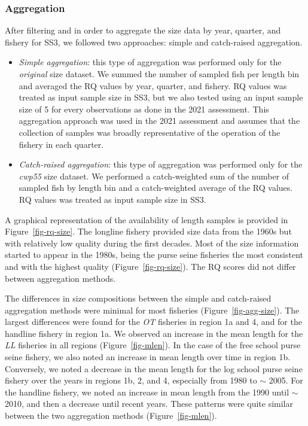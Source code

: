 \documentclass[
]{scrartcl}
\begin{document}
\subsubsection{Aggregation}\label{aggregation-1}

After filtering and in order to aggregate the size data by year,
quarter, and fishery for SS3, we followed two approaches: simple and
catch-raised aggregation.

\begin{itemize}
\item
  \emph{Simple aggregation}: this type of aggregation was performed only
  for the \emph{original} size dataset. We summed the number of sampled
  fish per length bin and averaged the RQ values by year, quarter, and
  fishery. RQ values was treated as input sample size in SS3, but we
  also tested using an input sample size of 5 for every observations as
  done in the 2021 assessment. This aggregation approach was used in the
  2021 assessment and assumes that the collection of samples was broadly
  representative of the operation of the fishery in each quarter.
\item
  \emph{Catch-raised aggregation}: this type of aggregation was
  performed only for the \emph{cwp55} size dataset. We performed a
  catch-weighted sum of the number of sampled fish by length bin and a
  catch-weighted average of the RQ values. RQ values was treated as
  input sample size in SS3.
\end{itemize}

A graphical representation of the availability of length samples is
provided in Figure~\ref{fig-rq-size}. The longline fishery provided size
data from the 1960s but with relatively low quality during the first
decades. Most of the size information started to appear in the 1980s,
being the purse seine fisheries the most consistent and with the highest
quality (Figure~\ref{fig-rq-size}). The RQ scores did not differ between
aggregation methods.

The differences in size compositions between the simple and catch-raised
aggregation methods were minimal for most fisheries
(Figure~\ref{fig-agg-size}). The largest differences were found for the
\emph{OT} fisheries in region 1a and 4, and for the handline fishery in
region 1a. We observed an increase in the mean length for the \emph{LL}
fisheries in all regions (Figure~\ref{fig-mlen}). In the case of the
free school purse seine fishery, we also noted an increase in mean
length over time in region 1b. Conversely, we noted a decrease in the
mean length for the log school purse seine fishery over the years in
regions 1b, 2, and 4, especially from 1980 to \(\sim\) 2005. For the
handline fishery, we noted an increase in mean length from the 1990
until \(\sim\) 2010, and then a decrease until recent years. These
patterns were quite similar between the two aggregation methods
(Figure~\ref{fig-mlen}).
\end{document}
